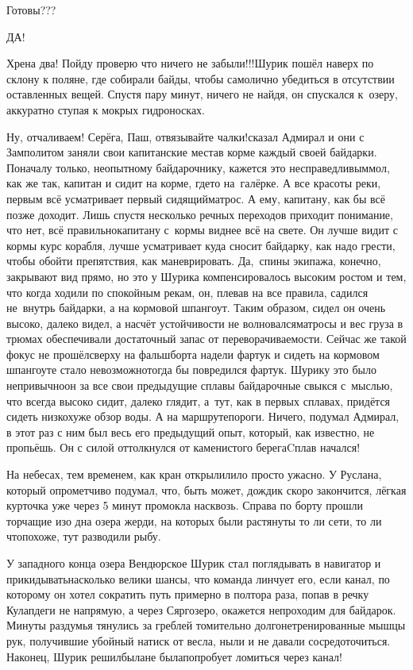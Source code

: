 \mdash Готовы???

\mdash ДА!

\mdash Хрена два! Пойду проверю что ничего не забыли!!!\mdash Шурик пошёл наверх по склону к поляне, где собирали байды, чтобы самолично убедиться в отсутствии оставленных вещей. Спустя пару минут, ничего не найдя, он спускался к~озеру, аккуратно ступая к мокрых гидроносках.

\mdash Ну, отчаливаем! Серёга, Паш, отвязывайте чалки!\mdash сказал Адмирал и они с Замполитом заняли свои капитанские места\mdash в корме каждый своей байдарки. Поначалу только, неопытному байдарочнику, кажется это несправедливым\mdash мол, как же так, капитан и сидит на корме, где\sdash то на~галёрке. А все красоты реки, первым всё усматривает первый сидящий\mdash матрос. А ему, капитану, как бы всё позже доходит. Лишь спустя несколько речных переходов приходит понимание, что нет, всё правильно\mdash капитану с~кормы виднее всё на свете. Он лучше видит с кормы курс корабля, лучше усматривает куда сносит байдарку, как надо грести, чтобы обойти препятствия, как маневрировать. Да,~спины экипажа, конечно, закрывают вид прямо, но это у Шурика компенсировалось высоким ростом и тем, что когда ходили по спокойным рекам, он, плевав на все правила, садился не~внутрь байдарки, а на кормовой шпангоут. Таким образом, сидел он очень высоко, далеко видел, а насчёт устойчивости не волновался\mdash матросы и вес груза в трюмах обеспечивали достаточный запас от переворачиваемости. Сейчас же такой фокус не прошёл\mdash сверху на фальшборта надели фартук и сидеть на кормовом шпангоуте стало невозможно\mdash тогда бы повредился фартук. Шурику это было непривычно\mdash он за все свои предыдущие сплавы байдарочные свыкся с~мыслью, что всегда высоко сидит, далеко глядит, а~тут, как в первых сплавах, придётся сидеть низко\mdash хуже обзор воды. А на маршруте\mdash пороги. Ничего, подумал Адмирал, в этот раз с ним был весь его предыдущий опыт, который, как известно, не пропьёшь. Он с силой оттолкнулся от каменистого берега\mdash Cплав начался!

На небесах, тем временем, как кран открыли\mdash лило просто ужасно. У Руслана, который опрометчиво подумал, что, быть может, дождик скоро закончится, лёгкая курточка уже через 5 минут промокла насквозь. Справа по борту прошли торчащие изо дна озера жерди, на которых были растянуты то ли сети, то ли что\mdash похоже, тут разводили рыбу. 

У западного конца озера Вендюрское Шурик стал поглядывать в навигатор и прикидывать\mdash насколько велики шансы, что команда линчует его, если канал, по которому он хотел сократить путь примерно в полтора раза, попав в речку Кулапдеги не напрямую, а через Сяргозеро, окажется непроходим для байдарок. Минуты раздумья тянулись за греблей томительно долго\mdash нетренированные мышцы рук, получившие убойный натиск от весла, ныли и не давали сосредоточиться. Наконец, Шурик решил\mdash была\sdash не была\mdash попробует ломиться через канал!

